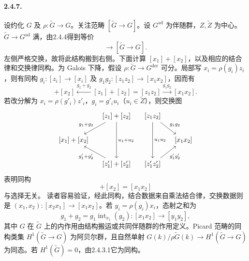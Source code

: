 \paragraph*{2.4.7.} 设约化 $G$ 及 $\rho:\widetilde G\to G$。关注范畴 $[\widetilde G\to G]$。设 $G^{\mathrm{ad}}$ 为伴随群，$Z,\widetilde Z$ 为中心。$\widetilde G\to G^{\mathrm{ad}}$ 满，由2.4.4得到等价
\begin{equation}
 [\widetilde Z\to Z]\longrightarrow[\widetilde G\to G].
 \tag{2.4.7.1}
\end{equation}
左侧严格交换，故将此结构搬到右侧。下面计算 $[x_1]+[x_2]$，以及相应的结合律和交换律同构。为 Galois 下降，假设 $\rho:\widetilde G\to G^{\mathrm{der}}$ 可分。局部写 $x_i=\rho(g_i)z_i$，则有同构 $g_i:[z_i]\to[x_i]$ 及 $g_1g_2:[z_1z_2]\to[x_1x_2]$，因而有
\begin{equation}
 [x_1]+[x_2]\xleftarrow{g_1+g_2}[z_1]+[z_2]=[z_1z_2]
 \xrightarrow{g_1g_2}[x_1x_2].
 \tag{2.4.7.2}
\end{equation}
若改分解为 $x_i=\rho(g'_i)z'_i$，$g_i=g'_iu_i$（$u_i\in\widetilde Z$），则交换图
\[
 \begin{tikzcd}[column sep=small]
 &{[z_1]+[z_2]}\arrow[dl,"g_1+g_2"']\arrow[dd,"u_1+u_2"]&{[z_1z_2]}\arrow[dd,"u_1u_2"]\arrow[dr,"g_1g_2"]&\\
 {[x_1]+[x_2]}&&&{[x_1x_2]}\\
 &{[z'_1]+[z'_2]}\arrow[ul,"g'_1+g'_2"]&{[z'_1z'_2]}\arrow[ur,"g'_1g'_2"']&
 \end{tikzcd}
\]
表明同构
\begin{equation}
 [x_1]+[x_2]=[x_1x_2]
 \tag{2.4.7.3}
\end{equation}
与选择无关。
读者容易验证，经此同构，结合数据来自乘法结合律，交换数据则是 $(x_1,x_2):[x_2x_1]\to[x_1x_2]$。若 $y_i=\rho(g_i)x_i$，态射之和为
\[
 g_1+g_2=g_1\operatorname{int}_{x_1}(g_2):[x_1x_2]\to[y_1y_2],
\]
其中 $G$ 在 $\widetilde G$ 上的内作用由结构搬运或共同伴随群的作用定义。Picard 范畴的同构类集 $H^1(\widetilde G\to G)$ 为阿贝尔群，且自然单射 $G(k)/\rho\widetilde G(k)\to H^1(\widetilde G\to G)$ 为同态。若 $H^1(\widetilde G)=0$，由2.4.3.1它为同构。

